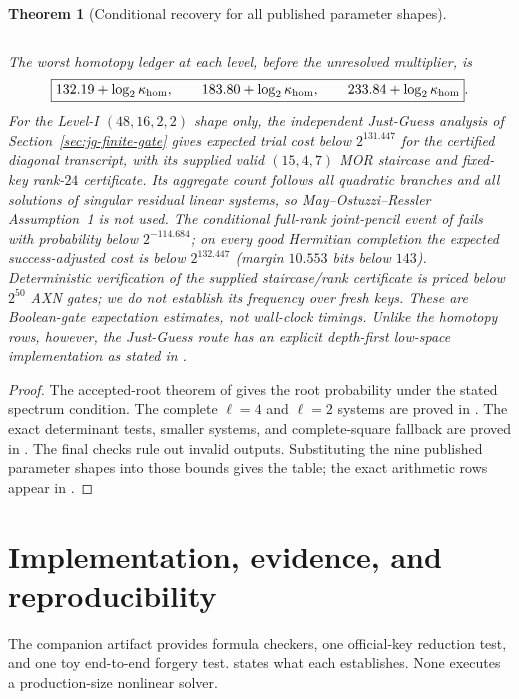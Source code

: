 \documentclass[11pt]{article}
\newtheorem{theorem}{Theorem}[section]
\begin{document}
\begin{theorem}[Conditional recovery for all published parameter shapes]
\begin{center}
\begin{tabularx}{\textwidth}{@{}c l >{\raggedright\arraybackslash}X r r@{}}
\bottomrule
\end{tabularx}
\end{center}
The worst homotopy ledger at each level, before the unresolved multiplier, is
\begin{equation}
 \boxed{132.19+\log_2\kappa_{\rm hom},\qquad
        183.80+\log_2\kappa_{\rm hom},\qquad
        233.84+\log_2\kappa_{\rm hom}}.  \label{eq:sq-headline}
\end{equation}
For the Level-I $(48,16,2,2)$ shape only, the independent Just-Guess analysis
of Section~\ref{sec:jg-finite-gate} gives expected trial cost below
$2^{131.447}$ for the certified diagonal transcript, with its supplied valid $(15,4,7)$ MOR staircase and
fixed-key rank-$24$ certificate.  Its aggregate count follows
all
quadratic branches and all solutions of singular residual linear systems, so
May--Ostuzzi--Ressler Assumption~1 is not used.  The conditional full-rank
joint-pencil event of  fails with probability below
$2^{-114.684}$; on every good Hermitian completion the expected
success-adjusted cost is below $2^{132.447}$ (margin $10.553$ bits below
$143$).  Deterministic verification of the supplied staircase/rank certificate is priced below $2^{50}$ AXN gates; we do not establish its frequency over fresh keys.  These are
Boolean-gate expectation estimates, not wall-clock timings.  Unlike the homotopy rows, however, the Just-Guess route has an explicit depth-first low-space implementation as stated in .
\end{theorem}

\begin{proof}
The accepted-root theorem of  gives the root
probability under the stated spectrum condition.  The complete $\ell=4$ and
$\ell=2$ systems are proved in .
The exact determinant tests, smaller systems, and complete-square fallback are
proved in .  The final checks rule out invalid
outputs.  Substituting the nine published parameter shapes into
those bounds gives the table; the exact arithmetic rows appear in
.
\end{proof}

\section{Implementation, evidence, and reproducibility}
\label{sec:implementation}

The companion artifact provides formula checkers, one official-key reduction
test, and one toy end-to-end forgery test.  
states what each establishes.  None executes a production-size nonlinear
solver.
\end{document}
